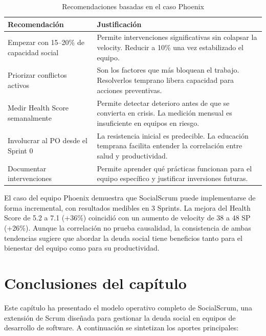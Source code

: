 \begin{table}[h]
    \centering
    \small
    \begin{tabularx}{\textwidth}{|l|X|}
        \hline
        \textbf{Recomendación}                   & \textbf{Justificación}                                                                                                    \\
        \hline
        Empezar con 15--20\% de capacidad social & Permite intervenciones significativas sin colapsar la velocity. Reducir a 10\% una vez estabilizado el equipo.            \\
        \hline
        Priorizar conflictos activos             & Son los factores que más bloquean el trabajo. Resolverlos temprano libera capacidad para acciones preventivas.            \\
        \hline
        Medir Health Score semanalmente          & Permite detectar deterioro antes de que se convierta en crisis. La medición mensual es insuficiente en equipos en riesgo. \\
        \hline
        Involucrar al PO desde el Sprint 0       & La resistencia inicial es predecible. La educación temprana facilita entender la correlación entre salud y productividad. \\
        \hline
        Documentar intervenciones                & Permite aprender qué prácticas funcionan para el equipo específico y justificar inversiones futuras.                      \\
        \hline
    \end{tabularx}
    \caption{Recomendaciones basadas en el caso Phoenix}
    \label{tab:recomendaciones-phoenix}
\end{table}
\FloatBarrier

El caso del equipo Phoenix demuestra que SocialScrum puede implementarse de forma incremental, con resultados medibles en 3 Sprints. La mejora del Health Score de 5.2 a 7.1 (+36\%) coincidió con un aumento de velocity de 38 a 48 SP (+26\%). Aunque la correlación no prueba causalidad, la consistencia de ambas tendencias sugiere que abordar la deuda social tiene beneficios tanto para el bienestar del equipo como para su productividad.

\section{Conclusiones del capítulo}
Este capítulo ha presentado el modelo operativo completo de SocialScrum, una extensión de Scrum diseñada para gestionar la deuda social en equipos de desarrollo de software. A continuación se sintetizan los aportes principales:

